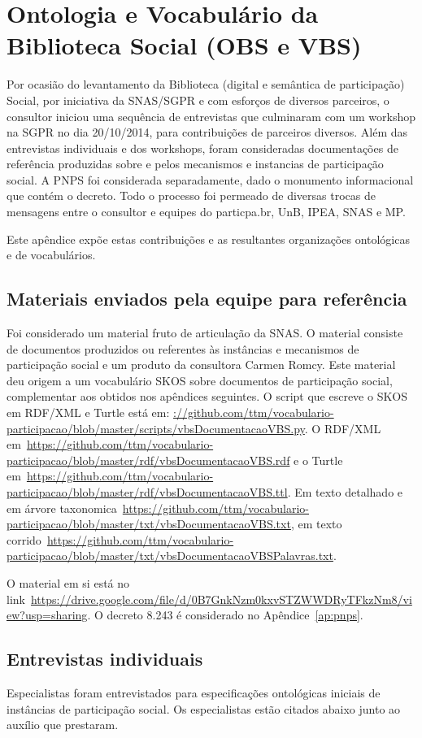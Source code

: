\documentclass[12pt]{article}
\begin{document}
\section{Ontologia e Vocabulário da Biblioteca Social (OBS e VBS)}
Por ocasião do levantamento da Biblioteca (digital e semântica de participação) Social, por iniciativa da SNAS/SGPR e com esforços de diversos parceiros, o consultor iniciou uma sequência de entrevistas que culminaram com um workshop na SGPR no dia 20/10/2014, para contribuições de parceiros diversos. Além das entrevistas individuais e dos workshops, foram consideradas documentações de referência produzidas sobre e pelos mecanismos e instancias de participação social. A PNPS foi considerada separadamente, dado o monumento informacional que contém o decreto. Todo o processo foi permeado de diversas trocas de mensagens entre o consultor e equipes do particpa.br, UnB, IPEA, SNAS e MP.

Este apêndice expõe estas contribuições e as resultantes organizações ontológicas e de vocabulários.

\subsection{Materiais enviados pela equipe para referência}
Foi considerado um material fruto de articulação da SNAS. O material consiste de documentos produzidos ou referentes às instâncias e mecanismos de participação social e um produto da consultora Carmen Romcy. Este material deu origem a um vocabulário SKOS sobre documentos de participação social, complementar aos obtidos nos apêndices seguintes. O script que escreve o SKOS em RDF/XML e Turtle está em: \url{://github.com/ttm/vocabulario-participacao/blob/master/scripts/vbsDocumentacaoVBS.py}. O RDF/XML em~\url{https://github.com/ttm/vocabulario-participacao/blob/master/rdf/vbsDocumentacaoVBS.rdf} e o Turtle em~\url{https://github.com/ttm/vocabulario-participacao/blob/master/rdf/vbsDocumentacaoVBS.ttl}. Em texto detalhado e em árvore taxonomica~\url{https://github.com/ttm/vocabulario-participacao/blob/master/txt/vbsDocumentacaoVBS.txt}, em texto corrido~\url{https://github.com/ttm/vocabulario-participacao/blob/master/txt/vbsDocumentacaoVBSPalavras.txt}.

O material em si está no link~\url{https://drive.google.com/file/d/0B7GnkNzm0kxvSTZWWDRyTFkzNm8/view?usp=sharing}.
 O decreto 8.243 é considerado no Apêndice~\ref{ap:pnps}.

\subsection{Entrevistas individuais}
Especialistas foram entrevistados para especificações ontológicas iniciais de instâncias de participação social. Os especialistas estão citados abaixo junto ao auxílio que prestaram.
\end{document}
